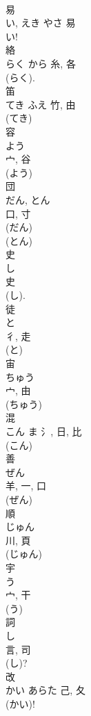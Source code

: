 \documentclass[8pt]{extreport}
\begin{document}
\begin{CJK}{UTF8}{min}
\\	易	
\\	い, えき	やさ	易	
\\	い! 
\\	絡	
\\	らく	から	糸, 各	
\\	(らく). 
\\	笛	
\\	てき	ふえ	竹, 由	
\\	(てき) 
\\	容	
\\	よう	
\\	宀, 谷	
\\	(よう) 
\\	団	
\\	だん, とん	
\\	口, 寸	
\\	(だん) 
\\	(とん) 
\\	史	
\\	し	
\\	史	
\\	(し). 
\\	徒	
\\	と	
\\	彳, 走	
\\	(と) 
\\	宙	
\\	ちゅう	
\\	宀, 由	
\\	(ちゅう) 
\\	混	
\\	こん	ま	氵, 日, 比	
\\	(こん) 
\\	善	
\\	ぜん	
\\	羊, 一, 口		
\\	(ぜん) 
\\	順	
\\	じゅん	
\\	川, 頁	
\\	(じゅん) 
\\	宇	
\\	う	
\\	宀, 干	
\\	(う) 
\\	詞	
\\	し	
\\	言, 司	
\\	(し)?
\\	改	
\\	かい	あらた	己, 夂	
\\	(かい)! 

\end{CJK}
\end{document}
